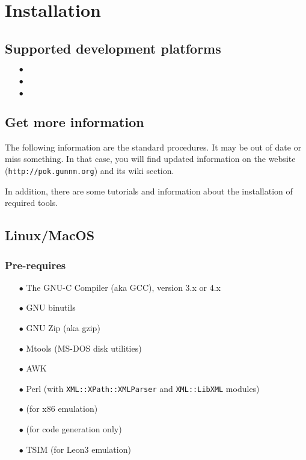 %
% 
%
%
%
%
%


\chapter{Installation}
   \label{chapter-installation}
   \section{Supported development platforms}
   \begin{itemize}
      \item[$\bullet$] \linux
      \item[$\bullet$] \macosx
      \item[$\bullet$] \windows
   \end{itemize}

   \section{Get more information}
   The following information are the standard procedures. It may be out of date
   or miss something. In that case, you will find updated information on the
   \pok website (\texttt{http://pok.gunnm.org}) and its wiki section.

   In addition, there are some tutorials and information about the installation
   of required tools.

   \section{Linux/MacOS}
      \subsection{Pre-requires}
      \begin{itemize}
         \item[$\bullet$] The GNU-C Compiler (aka GCC), version 3.x or 4.x
         \item[$\bullet$] GNU binutils
         \item[$\bullet$] GNU Zip (aka gzip)
         \item[$\bullet$] Mtools (MS-DOS disk utilities)
         \item[$\bullet$] AWK
         \item[$\bullet$] Perl (with \texttt{XML::XPath::XMLParser} and
            \texttt{XML::LibXML} modules)
         \item[$\bullet$] \qemu (for x86 emulation)
         \item[$\bullet$] \ocarina (for code generation only)
         \item[$\bullet$] TSIM (for Leon3 emulation)
      \end{itemize}

